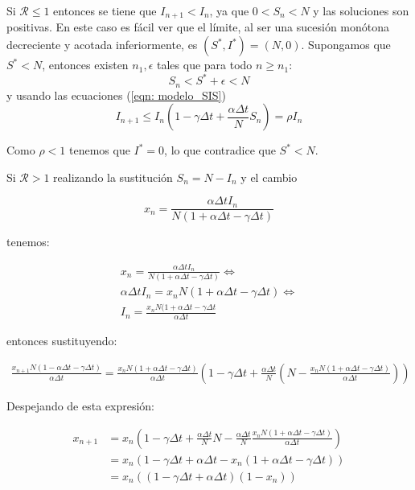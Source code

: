 Si $\mathcal{R}\leq 1$ entonces se tiene que $I_{n+1} < I_n$, ya que $0<S_n<N$ y las soluciones son positivas. En este caso es fácil ver que el límite, al ser una sucesión monótona decreciente y acotada inferiormente, es $(S^*,I^*)=(N,0)$. Supongamos que $S^*<N$, entonces existen $n_1, \epsilon$ tales que para todo $n \geq n_1$:
$$S_n<S^*+\epsilon < N$$
y usando las ecuaciones (\ref{eqn: modelo_SIS})
$$I_{n+1} \leq I_n \left( 1-\gamma \Delta t + \frac{\alpha\Delta t}{N} S_n \right) = \rho I_n$$

Como $\rho < 1$ tenemos que $I^*=0$, lo que contradice que $S^*<N$.

Si $\mathcal{R}>1$ realizando la sustitución $S_n=N-I_n$ y el cambio

$$x_n=\frac{\alpha \Delta t I_n}{N(1+\alpha \Delta t - \gamma \Delta t)}$$

tenemos:

\begin{equation}
\begin{aligned}
x_n=\frac{\alpha \Delta t I_n}{N(1+\alpha \Delta t - \gamma \Delta t)} \Leftrightarrow \\
\alpha\Delta t I_n = x_nN(1+\alpha\Delta t-\gamma\Delta t) \Leftrightarrow \\
I_n = \frac{x_nN(1+\alpha\Delta t - \gamma\Delta t}{\alpha\Delta t}
\end{aligned}
\end{equation}

entonces sustituyendo:

\begin{equation}
\begin{aligned}
\frac{x_{n+1}N(1-\alpha\Delta t-\gamma\Delta t)}{\alpha \Delta t} = \frac{x_nN(1+\alpha\Delta t-\gamma \Delta t)}{\alpha\Delta t}\left( 1-\gamma\Delta t+\frac{\alpha\Delta t}{N}\left(N-\frac{x_nN(1+\alpha\Delta t-\gamma\Delta t)}{\alpha\Delta t}\right) \right)
\end{aligned}
\end{equation}

Despejando de esta expresión:

\begin{equation}
\begin{aligned}
x_{n+1} & = x_n\left( 1-\gamma\Delta t+\frac{\alpha\Delta t}{N}N-\frac{\alpha\Delta t}{N}\frac{x_nN(1+\alpha\Delta t -\gamma \Delta t)}{\alpha\Delta t} \right) \\
& = x_n(1-\gamma\Delta t + \alpha\Delta t -x_n(1+\alpha\Delta t -\gamma\Delta t)) \\
& = x_n((1-\gamma\Delta t+\alpha\Delta t)(1-x_n))
\end{aligned}
\end{equation}

